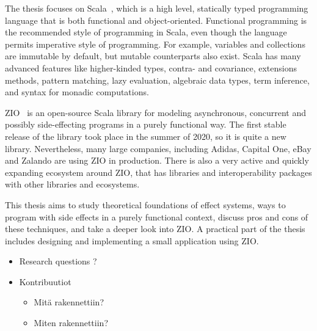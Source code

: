 The thesis focuses on Scala~\cite{scala}, which is a high level, statically typed programming language that is both functional and object-oriented. Functional programming is the recommended style of programming in Scala, even though the language permits imperative style of programming. For example, variables and collections are immutable by default, but mutable counterparts also exist. Scala has many advanced features like higher-kinded types, contra- and covariance, extensions methods, pattern matching, lazy evaluation, algebraic data types, term inference, and syntax for monadic computations.

ZIO~\cite{zio} is an open-source Scala library for modeling asynchronous, concurrent and possibly side-effecting programs in a purely functional way. The first stable release of the library took place in the summer of 2020, so it is quite a new library. Nevertheless, many large companies, including Adidas, Capital One, eBay and Zalando are using ZIO in production. There is also a very active and quickly expanding ecosystem around ZIO, that has libraries and interoperability packages with other libraries and ecosystems.

This thesis aims to study theoretical foundations of effect systems, ways to program with side effects in a purely functional context, discuss pros and cons of these techniques, and take a deeper look into ZIO. A practical part of the thesis includes designing and implementing a small application using ZIO.


\begin{itemize}
    \item Research questions ?

    \item Kontribuutiot
    \begin{itemize}
        \item Mitä rakennettiin?
        \item Miten rakennettiin?
    \end{itemize}
\end{itemize}
